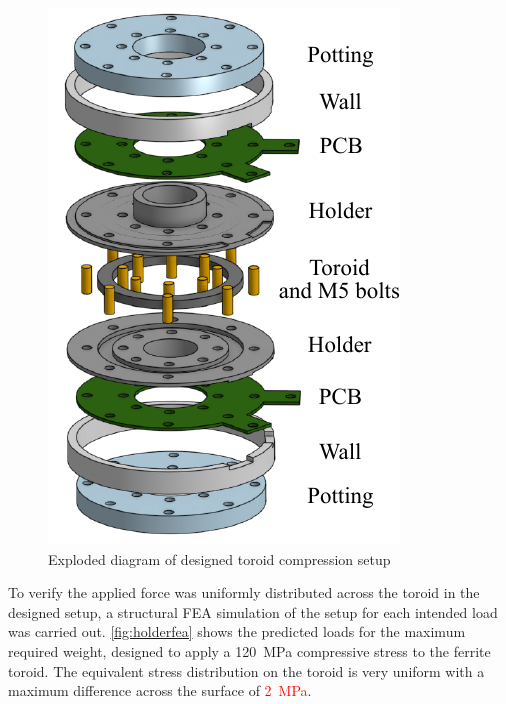 \documentclass[conference]{IEEEtran}
\begin{document}
\begin{figure}
  \centering
  \includegraphics{figures/compressionholder.pdf}
  \caption{Exploded diagram of designed toroid compression setup}
  \label{fig:compressionholder}
\end{figure}

To verify the applied force was uniformly distributed across the toroid in the designed setup, a structural FEA simulation of the setup for each intended load was carried out. 
\cref{fig:holderfea} shows the predicted loads for the maximum required weight, designed to apply a \SI{120}{\mega\pascal} compressive stress to the ferrite toroid.
The equivalent stress distribution on the toroid is very uniform with a maximum difference across the surface of \textcolor{red}{\SI{2}{\mega\pascal}}.
\end{document}
